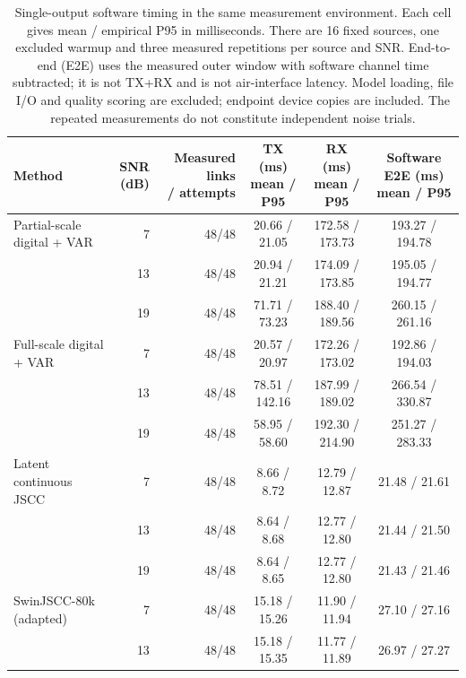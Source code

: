 \begin{table}[t]
\centering
\caption{Single-output software timing in the same measurement environment.
Each cell gives mean / empirical P95 in milliseconds. There are 16 fixed sources,
one excluded warmup and three measured repetitions per source and SNR.
End-to-end (E2E) uses the measured outer window with software channel time
subtracted; it is not TX+RX and is not air-interface latency.
Model loading, file I/O and quality scoring are excluded; endpoint device copies
are included. The repeated measurements do not constitute independent noise trials.}
\label{tab:single-output-timing}
\small
\setlength{\tabcolsep}{3pt}
\begin{tabular*}{\textwidth}{@{\extracolsep{\fill}}lrrccc@{}}
\toprule
Method & \shortstack{SNR\\(dB)} & \shortstack{Measured links\\/ attempts} & \shortstack{TX (ms)\\mean / P95} & \shortstack{RX (ms)\\mean / P95} & \shortstack{Software E2E (ms)\\mean / P95} \\
\midrule
Partial-scale digital + VAR & 7 & 48/48 & 20.66 / 21.05 & 172.58 / 173.73 & 193.27 / 194.78 \\
 & 13 & 48/48 & 20.94 / 21.21 & 174.09 / 173.85 & 195.05 / 194.77 \\
 & 19 & 48/48 & 71.71 / 73.23 & 188.40 / 189.56 & 260.15 / 261.16 \\
\addlinespace[2pt]
Full-scale digital + VAR & 7 & 48/48 & 20.57 / 20.97 & 172.26 / 173.02 & 192.86 / 194.03 \\
 & 13 & 48/48 & 78.51 / 142.16 & 187.99 / 189.02 & 266.54 / 330.87 \\
 & 19 & 48/48 & 58.95 / 58.60 & 192.30 / 214.90 & 251.27 / 283.33 \\
\addlinespace[2pt]
Latent continuous JSCC & 7 & 48/48 & 8.66 / 8.72 & 12.79 / 12.87 & 21.48 / 21.61 \\
 & 13 & 48/48 & 8.64 / 8.68 & 12.77 / 12.80 & 21.44 / 21.50 \\
 & 19 & 48/48 & 8.64 / 8.65 & 12.77 / 12.80 & 21.43 / 21.46 \\
\addlinespace[2pt]
SwinJSCC-80k (adapted) & 7 & 48/48 & 15.18 / 15.26 & 11.90 / 11.94 & 27.10 / 27.16 \\
 & 13 & 48/48 & 15.18 / 15.35 & 11.77 / 11.89 & 26.97 / 27.27 \\

\end{tabular*}
\end{table}
